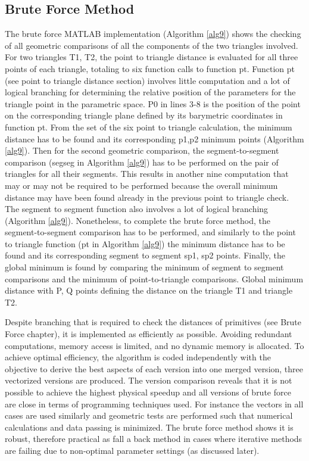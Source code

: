 \documentclass[times,12pt]{ACME2015article}
\begin{document}
\subsection{Brute Force Method}
The brute force MATLAB implementation (Algorithm \ref{alg9}) shows the checking of all geometric comparisons of all the components of the two triangles involved. For two triangles T1, T2, the point to triangle distance is evaluated for all three points of each triangle, totaling to six function calls to function pt. Function pt (see point to triangle distance section) involves little computation and a lot of logical branching for determining the relative position of the parameters for the triangle point in the parametric space. P0 in lines 3-8 is the position of the point on the corresponding triangle plane defined by its barymetric coordinates in function pt. From the set of the six point to triangle calculation, the minimum distance has to be found and its corresponding p1,p2 minimum points (Algorithm \ref{alg9}). Then for the second geometric comparison, the segment-to-segment comparison (segseg in Algorithm \ref{alg9}) has to be performed on the pair of triangles for all their segments. This results in another nine computation that may or may not be required to be performed because the overall minimum distance may have been found already in the previous point to triangle check. The segment to segment function also involves a lot of logical branching (Algorithm \ref{alg9}). Nonetheless, to complete the brute force method, the segment-to-segment comparison has to be performed, and similarly to the point to triangle function (pt in Algorithm \ref{alg9}) the minimum distance has to be found and its corresponding segment to segment sp1, sp2 points. Finally, the global minimum is found by comparing the minimum of segment to segment comparisons and the minimum of point-to-triangle comparisons. Global minimum distance with P, Q points defining the distance on the triangle T1 and triangle T2.

Despite branching that is required to check the distances of primitives (see Brute Force chapter), it is implemented as efficiently as possible. Avoiding redundant computations, memory access is limited, and no dynamic memory is allocated. To achieve optimal efficiency, the algorithm is coded independently with the objective to derive the best aspects of each version into one merged version, three vectorized versions are produced. The version comparison reveals that it is not possible to achieve the highest physical speedup and all versions of brute force are close in terms of programming techniques used. For instance the vectors in all cases are used similarly and geometric tests are performed such that numerical calculations and data passing is minimized. The brute force method shows it is robust, therefore practical as fall a back method in cases where iterative methods are failing due to non-optimal parameter settings (as discussed later). 
\end{document}
